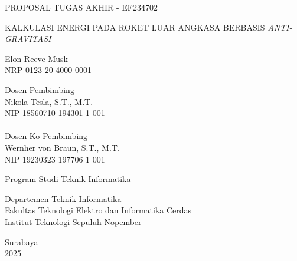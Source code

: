 \begin{large}
  PROPOSAL TUGAS AKHIR - EF234702
\end{large}

\vspace{\fill}

\begin{spacing}{1.5}
  \begin{Large}
    KALKULASI ENERGI PADA ROKET LUAR 
    ANGKASA BERBASIS \emph{ANTI-GRAVITASI}
  \end{Large}
\end{spacing}

\vspace{\fill}

\begin{large}
  Elon Reeve Musk \\
  \textmd{NRP 0123 20 4000 0001}
\end{large}

\vspace{\fill}

\begin{large}
  \textmd{Dosen Pembimbing} \\
  Nikola Tesla, S.T., M.T. \\
  \textmd{NIP 18560710 194301 1 001} \\
  ~ \\
  \textmd{Dosen Ko-Pembimbing} \\
  Wernher von Braun, S.T., M.T. \\
  \textmd{NIP 19230323 197706 1 001}
\end{large}

\vspace{\fill}

Program Studi Teknik Informatika \\

\mdseries

Departemen Teknik Informatika \\
Fakultas Teknologi Elektro dan Informatika Cerdas \\
Institut Teknologi Sepuluh Nopember

Surabaya \\
2025
